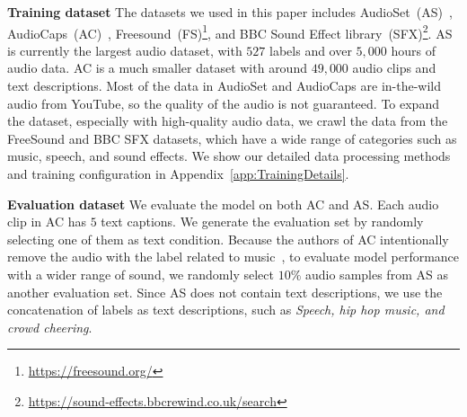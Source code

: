 \documentclass{article}
\begin{document}
\textbf{Training dataset} The datasets we used in this paper includes AudioSet~(AS)~\cite{gemmeke2017audio}, AudioCaps~(AC)~\cite{kim2019audiocaps}, Freesound~(FS)\footnote{\url{https://freesound.org/}}, and BBC Sound Effect library~(SFX)\footnote{\url{https://sound-effects.bbcrewind.co.uk/search}}. AS is currently the largest audio dataset, with $527$ labels and over $5,000$ hours of audio data. AC is a much smaller dataset with around $49,000$ audio clips and text descriptions. Most of the data in AudioSet and AudioCaps are in-the-wild audio from YouTube, so the quality of the audio is not guaranteed. To expand the dataset, especially with high-quality audio data, we crawl the data from the FreeSound and BBC SFX datasets, which have a wide range of categories such as music, speech, and sound effects. We show our detailed data processing methods and training configuration in Appendix~\ref{app:TrainingDetails}.

\textbf{Evaluation dataset} We evaluate the model on both AC and AS. Each audio clip in AC has $5$ text captions. We generate the evaluation set by randomly selecting one of them as text condition. Because the authors of AC intentionally remove the audio with the label related to music~\cite{kim2019audiocaps}, to evaluate model performance with a wider range of sound, we randomly select $10\%$ audio samples from AS as another evaluation set. Since AS does not contain text descriptions, we use the concatenation of labels as text descriptions, such as \textit{Speech, hip hop music, and crowd cheering}. 
\end{document}
